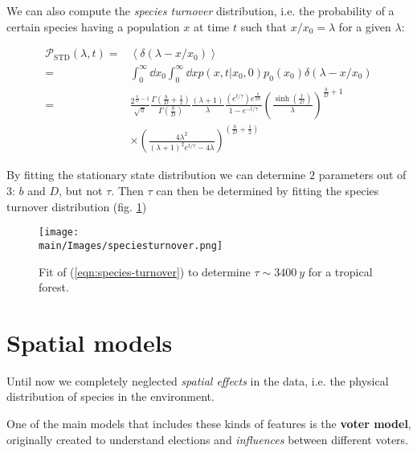 \documentclass[../../main.tex]{subfiles}
\begin{document}
We can also compute the \textit{species turnover} distribution, i.e. the probability of a certain species having a population $x$ at time $t$ such that $x/x_0 = \lambda$ for a given $\lambda$:

\begin{align} \nonumber
    \mathcal{P}_{\mathrm{STD}}(\lambda, t)=&\left\langle\delta\left(\lambda-x / x_{0}\right)\right\rangle \\ \nonumber
    =& \int_{0}^{\infty} \dd{x_0} \int_{0}^{\infty} \dd{x} p\left(x, t | x_{0}, 0\right) p_{0}\left(x_{0}\right) \delta\left(\lambda-x / x_{0}\right) \\
    \nonumber
    =& \frac{2^{\frac{b}{D}-1}}{\sqrt{\pi}} \frac{\Gamma\left(\frac{b}{D} + \frac{1}{2}  \right)}{\Gamma\left(\frac{b}{D} \right)} \frac{(\lambda + 1)}{\lambda} \frac{(e^{t/\tau}) e^{\frac{b}{2D}}}{1 - e^{-t/\tau}} \left(\frac{\sinh \left(\frac{t}{2 \tau} \right)}{\lambda} \right)^{\frac{b}{D}+1 }   \\ \label{eqn:species-turnover}
    & \times\left(\frac{4 \lambda^{2}}{(\lambda+1)^{2} e^{t / \tau}-4 \lambda}\right)^{\left(\frac{b}{D} + \frac{1}{2} \right)}
\end{align}

By fitting the stationary state distribution we can determine $2$ parameters out of $3$: $b$ and $D$, but not $\tau$. Then $\tau$ can then be determined by fitting the species turnover distribution (fig. \ref{fig:speciesturnover})

\begin{figure}[H]
    \centering
    \texttt{[image: \\main/Images/speciesturnover.png]}
    \caption{Fit of (\ref{eqn:species-turnover}) to determine $\tau \sim \SI{3400}{y}$ for a tropical forest.}
    \label{fig:speciesturnover}
\end{figure}

\section{Spatial models}\label{sec:spatial-models}
Until now we completely neglected \textit{spatial effects} in the data, i.e. the physical distribution of species in the environment. 

One of the main models that includes these kinds of features is the \textbf{voter model}, originally created to understand elections and \textit{influences} between different voters.
\end{document}
